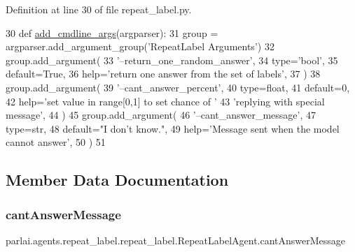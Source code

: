 Definition at line 30 of file repeat\+\_\+label.\+py.


\begin{DoxyCode}
30     \textcolor{keyword}{def }\hyperlink{namespaceparlai_1_1agents_1_1drqa_1_1config_a62fdd5554f1da6be0cba185271058320}{add\_cmdline\_args}(argparser):
31         group = argparser.add\_argument\_group(\textcolor{stringliteral}{'RepeatLabel Arguments'})
32         group.add\_argument(
33             \textcolor{stringliteral}{'--return\_one\_random\_answer'},
34             type=\textcolor{stringliteral}{'bool'},
35             default=\textcolor{keyword}{True},
36             help=\textcolor{stringliteral}{'return one answer from the set of labels'},
37         )
38         group.add\_argument(
39             \textcolor{stringliteral}{'--cant\_answer\_percent'},
40             type=float,
41             default=0,
42             help=\textcolor{stringliteral}{'set value in range[0,1] to set chance of '}
43             \textcolor{stringliteral}{'replying with special message'},
44         )
45         group.add\_argument(
46             \textcolor{stringliteral}{'--cant\_answer\_message'},
47             type=str,
48             default=\textcolor{stringliteral}{"I don't know."},
49             help=\textcolor{stringliteral}{'Message sent when the model cannot answer'},
50         )
51 
\end{DoxyCode}


\subsection{Member Data Documentation}
\mbox{\label{classparlai_1_1agents_1_1repeat__label_1_1repeat__label_1_1RepeatLabelAgent_a761b9c11bf08499c0da88de5ec9fb406}} 
\subsubsection{\texorpdfstring{cant\+Answer\+Message}{cantAnswerMessage}}
{\footnotesize\ttfamily parlai.\+agents.\+repeat\+\_\+label.\+repeat\+\_\+label.\+Repeat\+Label\+Agent.\+cant\+Answer\+Message}



